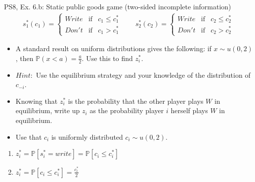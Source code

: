 \begin{frame}{PS8, Ex. 6.b: Static public goods game (two-sided incomplete information)}
    \begin{align*}
      s_1^*(c_1)=\left\{\begin{array}{rcl}
        Write & \text{if} & c_1\leq c_1^*\\
        Don't & \text{if} & c_1>c_1^*
        \end{array}\right.\quad\quad
      s_2^*(c_2)=\left\{\begin{array}{rcl}
        Write & \text{if} & c_2\leq c_2^*\\
        Don't & \text{if} & c_2>c_2^*
        \end{array}\right.
    \end{align*}
    \vspace{-12pt}
    \begin{itemize}
      \item[(b)] A standard result on uniform distributions gives the following: if $x\sim u(0, 2)$, then $\mathbb{P}(x<a)=\frac{a}{2}$. Use this to find $z_i^*$.
      \item[]    $Hint:$ Use the equilibrium strategy and your knowledge of the distribution of $c_{-i}$.
    \end{itemize}
    \begin{multicols}{2}
      \begin{itemize}
        \item[Step 1:] Knowing that $z_i^*$ is the probability that the other player plays $W$ in equilibrium, write up $z_i$ as the probability player $i$ herself plays $W$ in equilibrium.
        \item[Step 2:] Use that $c_i$ is uniformly distributed $c_i\sim u(0, 2)$.
      \end{itemize}
      \vfill\null\columnbreak
      \begin{enumerate}
        \item $z_i^*=\mathbb{P}[s_i^*=write]=\mathbb{P}[c_i\leq c_i^*]$
        \item $z_i^*=\mathbb{P}[c_i\leq c_i^*]=\frac{c_i^*}{2}$
      \end{enumerate}
      \vfill\null
    \end{multicols}
\end{frame}


